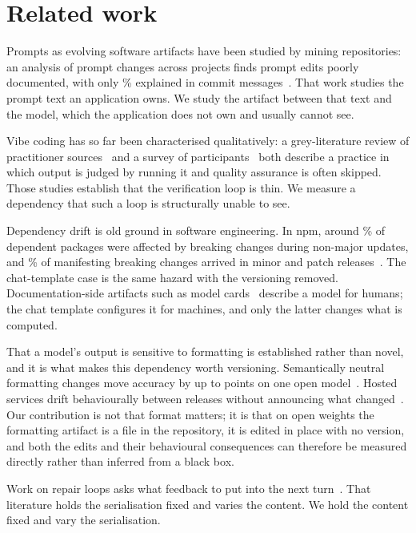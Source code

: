 \section{Related work}

Prompts as evolving software artifacts have been studied by mining repositories: an analysis of
 prompt changes across  projects finds prompt edits poorly documented, with
only \% explained in commit messages~\cite{tafreshipour2024prompting}. That work studies
the prompt text an application owns. We study the artifact between that text and the model, which
the application does not own and usually cannot see.

Vibe coding has so far been characterised qualitatively: a grey-literature review of 
practitioner sources~\cite{fawzy2026vibepractice} and a survey of 
participants~\cite{fawzy2026verification} both describe a practice in which output is judged by
running it and quality assurance is often skipped. Those studies establish that the verification
loop is thin. We measure a dependency that such a loop is structurally unable to see.

Dependency drift is old ground in software engineering. In npm, around \% of dependent
packages were affected by breaking changes during non-major updates, and \% of manifesting
breaking changes arrived in minor and patch releases~\cite{venturini2023depended}. The chat-template
case is the same hazard with the versioning removed. Documentation-side artifacts such as model
cards~\cite{mitchell2019modelcards} describe a model for humans; the chat template configures it for
machines, and only the latter changes what is computed.

That a model's output is sensitive to formatting is established rather than novel, and it is what
makes this dependency worth versioning. Semantically neutral formatting changes move accuracy by up
to  points on one open model~\cite{sclar2024formatspread}. Hosted services drift
behaviourally between releases without announcing what changed~\cite{chen2023chatgptdrift}. Our
contribution is not that format matters; it is that on open weights the formatting artifact is a
file in the repository, it is edited in place with no version, and both the edits and their
behavioural consequences can therefore be measured directly rather than inferred from a black box.

Work on repair loops asks what feedback to put into the next
turn~\cite{olausson2024selfrepair,ray2026structured,iscan2026falsification}. That literature holds
the serialisation fixed and varies the content. We hold the content fixed and vary the
serialisation.

